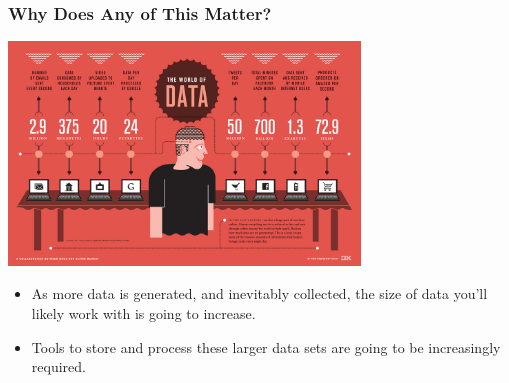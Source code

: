 \documentclass{beamer}
\begin{document}
\begin{frame}
  \frametitle{Why Does Any of This Matter?}
  \begin{center}
    \includegraphics[width=0.7\textwidth]{../images/world_of_data.jpeg}
  \end{center}
  \begin{itemize}
    \item As more data is generated, and inevitably collected, the size of data you'll likely work with is going to increase.
    \item Tools to store and process these larger data sets are going to be increasingly required.
  \end{itemize}
\end{frame}
\end{document}
